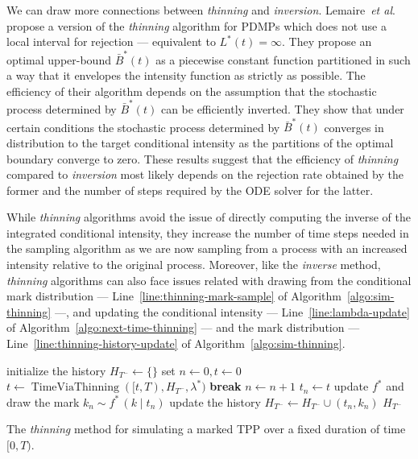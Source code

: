 \documentclass{juliacon}
\numberwithin{equation}{section}
\newcommand{\etal}{\textit{et al}.}
\begin{document}
We can draw more connections between \textit{thinning} and \textit{inversion}. Lemaire~\etal~\cite{lemaire2018} propose a version of the \textit{thinning} algorithm for PDMPs which does not use a local interval for rejection --- equivalent to \( L^\ast(t) = \infty \). They propose an optimal upper-bound \( \bar{B}^\ast(t) \) as a piecewise constant function partitioned in such a way that it envelopes the intensity function as strictly as possible. The efficiency of their algorithm depends on the assumption that the stochastic process determined by \( \bar{B}^\ast(t) \) can be efficiently inverted. They show that under certain conditions the stochastic process determined by \( \bar{B}^\ast(t) \) converges in distribution to the target conditional intensity as the partitions of the optimal boundary converge to zero. These results suggest that the efficiency of \textit{thinning} compared to \textit{inversion} most likely depends on the rejection rate obtained by the former and the number of steps required by the ODE solver for the latter.

While \textit{thinning} algorithms avoid the issue of directly computing the inverse of the integrated conditional intensity, they increase the number of time steps needed in the sampling algorithm as we are now sampling from a process with an increased intensity relative to the original process. Moreover, like the \textit{inverse} method, \textit{thinning} algorithms can also face issues related with drawing from the conditional mark distribution --- Line~\ref{line:thinning-mark-sample} of Algorithm~\ref{algo:sim-thinning} ---, and updating the conditional intensity --- Line~\ref{line:lambda-update} of Algorithm~\ref{algo:next-time-thinning} --- and the mark distribution --- Line~\ref{line:thinning-history-update} of Algorithm~\ref{algo:sim-thinning}.

\begin{algorithm}[h]
\begin{algorithmic}[1]
  \Procedure{ThinningMethod}{\( [0, T) \), \( \lambda^\ast \), \( f^\ast \),}
    \State initialize the history \( H_{T^-} \leftarrow \{ \} \)
    \State set \( n \leftarrow 0, t \leftarrow 0 \)
      \State \( t \leftarrow \operatorname{TimeViaThinning}([t, T), H_{T^-}, \lambda^\ast) \)
        \State \textbf{break}
      \EndIf
      \State \( n \leftarrow n + 1 \)
      \State \( t_n \leftarrow t \)
      \State update  \( f^\ast \) and draw the mark \( k_n \sim f^\ast \, (k \mid t_n) \) \label{line:thinning-mark-sample}
      \State update the history \( H_{T^-} \leftarrow H_{T^-} \cup (t_n, k_n) \) \label{line:thinning-history-update}
    \EndWhile
    \State \Return \( H_{T^-} \)
  \EndProcedure
\end{algorithmic}
\caption{The \textit{thinning} method for simulating a marked TPP over a fixed duration of time \( [0, T) \).}
\label{algo:sim-thinning}
\end{algorithm}
\end{document}

